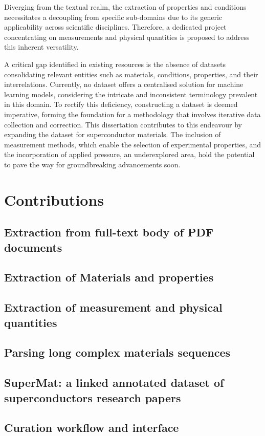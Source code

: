 Diverging from the textual realm, the extraction of properties and conditions necessitates a decoupling from specific sub-domains due to its generic applicability across scientific disciplines. 
Therefore, a dedicated project concentrating on measurements and physical quantities is proposed to address this inherent versatility. 

A critical gap identified in existing resources is the absence of datasets consolidating relevant entities such as materials, conditions, properties, and their interrelations. 
Currently, no dataset offers a centralised solution for machine learning models, considering the intricate and inconsistent terminology prevalent in this domain. 
To rectify this deficiency, constructing a dataset is deemed imperative, forming the foundation for a methodology that involves iterative data collection and correction. This dissertation contributes to this endeavour by expanding the dataset for superconductor materials. 
The inclusion of measurement methods, which enable the selection of experimental properties, and the incorporation of applied pressure, an underexplored area, hold the potential to pave the way for groundbreaking advancements soon.




\section{Contributions}

\subsection{Extraction from full-text body of PDF documents}
\subsection{Extraction of Materials and properties}
\subsection{Extraction of measurement and physical quantities}
\subsection{Parsing long complex materials sequences}
\subsection{SuperMat: a linked annotated dataset of superconductors research papers}
\subsection{Curation workflow and interface}

